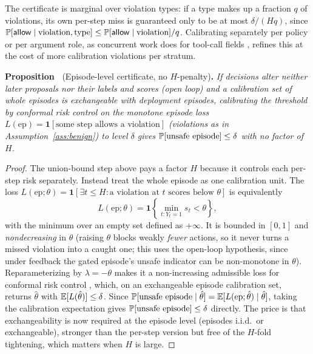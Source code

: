 \medskip
The certificate is marginal over violation types: if a type makes up a fraction
$q$ of violations, its own per-step miss is guaranteed only to be at most $\delta/(Hq)$,
since $\mathbb{P}[\mathsf{allow}\mid\text{violation},\text{type}]\le
\mathbb{P}[\mathsf{allow}\mid\text{violation}]/q$. Calibrating separately per policy or per
argument role, as concurrent work does for tool-call fields \citep{rahman2026role},
refines this at the cost of more calibration violations per stratum.

\medskip
\noindent{}\textbf{Proposition~\theproposition} (Episode-level certificate, no $H$-penalty)\textbf{.}
\emph{If decisions alter neither later proposals nor their labels and scores (open loop) and a calibration set of whole
episodes is exchangeable with deployment
episodes, calibrating the threshold by conformal risk control on the monotone
episode loss $L(\text{ep})=\mathbf{1}[\text{some step allows a violation}]$ (violations as in
Assumption~\ref{ass:benign}) to level
$\delta$ gives $\mathbb{P}[\text{unsafe episode}]\le\delta$ with no factor of $H$.}

\begin{proof}
The union-bound step above pays a factor $H$ because it controls each per-step risk
separately. Instead treat the whole episode as one calibration unit. The loss
$L(\text{ep};\theta)=\mathbf{1}[\exists t\le H:\text{a violation at }t\text{ scores
below }\theta]$ is equivalently
\[
L(\text{ep};\theta)
=\mathbf{1}\!\left\{\min_{t:Y_t=1}s_t<\theta\right\},
\]
with the minimum over an empty set defined as $+\infty$. It is bounded in
$[0,1]$ and \emph{nondecreasing} in $\theta$ (raising
$\theta$ blocks weakly \emph{fewer} actions, so it never turns a missed violation into a
caught one; this uses the open-loop hypothesis, since under feedback the gated episode's
unsafe indicator can be non-monotone in $\theta$). Reparameterizing by $\lambda=-\theta$
makes it a non-increasing admissible
loss for conformal risk control \citep{angelopoulos2024conformal}, which, on an
exchangeable episode calibration set, returns $\hat\theta$ with $\mathbb{E}[L(\hat\theta)]\le\delta$. Since
$\mathbb{P}[\text{unsafe episode}\mid\hat\theta]=\mathbb{E}[L(\text{ep};\hat\theta)\mid\hat\theta]$,
taking the calibration expectation gives $\mathbb{P}[\text{unsafe episode}]\le\delta$
directly. The price is that exchangeability is now required at the episode level
(episodes i.i.d.\ or exchangeable), stronger than the per-step version but free of
the $H$-fold tightening, which matters when $H$ is large.
\end{proof}

